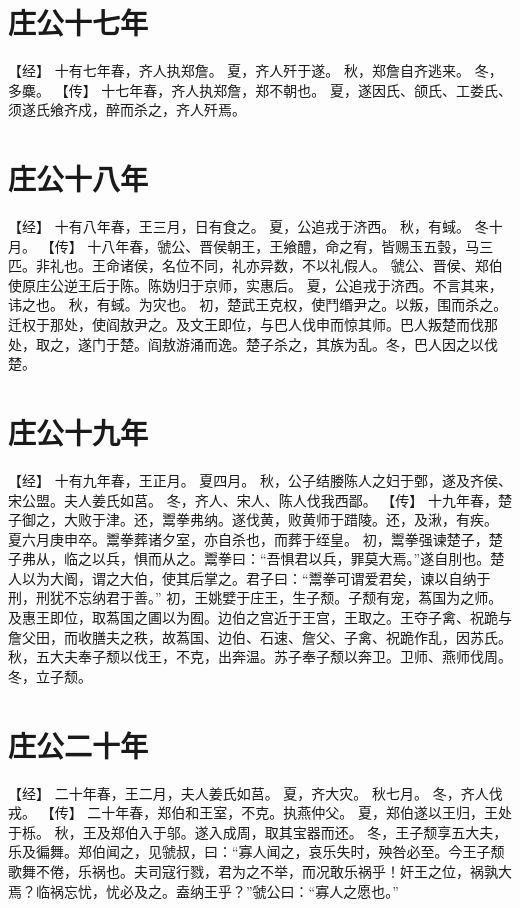 \documentclass[a4paper,12pt,UTF8,twoside]{ctexbook}
\begin{document}
\chapter{庄公十七年}

【经】
十有七年春，齐人执郑詹。
夏，齐人歼于遂。
秋，郑詹自齐逃来。
冬，多麋。
【传】
十七年春，齐人执郑詹，郑不朝也。
夏，遂因氏、颌氏、工娄氏、须遂氏飨齐戍，醉而杀之，齐人歼焉。

\chapter{庄公十八年}

【经】
十有八年春，王三月，日有食之。
夏，公追戎于济西。
秋，有蜮。
冬十月。
【传】
十八年春，虢公、晋侯朝王，王飨醴，命之宥，皆赐玉五瑴，马三匹。非礼也。王命诸侯，名位不同，礼亦异数，不以礼假人。
虢公、晋侯、郑伯使原庄公逆王后于陈。陈妫归于京师，实惠后。
夏，公追戎于济西。不言其来，讳之也。
秋，有蜮。为灾也。
初，楚武王克权，使鬥缗尹之。以叛，围而杀之。迁权于那处，使阎敖尹之。及文王即位，与巴人伐申而惊其师。巴人叛楚而伐那处，取之，遂门于楚。阎敖游涌而逸。楚子杀之，其族为乱。冬，巴人因之以伐楚。

\chapter{庄公十九年}

【经】
十有九年春，王正月。
夏四月。
秋，公子结媵陈人之妇于鄄，遂及齐侯、宋公盟。夫人姜氏如莒。
冬，齐人、宋人、陈人伐我西鄙。
【传】
十九年春，楚子御之，大败于津。还，鬻拳弗纳。遂伐黄，败黄师于踖陵。还，及湫，有疾。
夏六月庚申卒。鬻拳葬诸夕室，亦自杀也，而葬于绖皇。
初，鬻拳强谏楚子，楚子弗从，临之以兵，惧而从之。鬻拳曰：“吾惧君以兵，罪莫大焉。”遂自刖也。楚人以为大阍，谓之大伯，使其后掌之。君子曰：“鬻拳可谓爱君矣，谏以自纳于刑，刑犹不忘纳君于善。”
初，王姚嬖于庄王，生子颓。子颓有宠，蒍国为之师。及惠王即位，取蒍国之圃以为囿。边伯之宫近于王宫，王取之。王夺子禽、祝跪与詹父田，而收膳夫之秩，故蒍国、边伯、石速、詹父、子禽、祝跪作乱，因苏氏。
秋，五大夫奉子颓以伐王，不克，出奔温。苏子奉子颓以奔卫。卫师、燕师伐周。
冬，立子颓。

\chapter{庄公二十年}

【经】
二十年春，王二月，夫人姜氏如莒。
夏，齐大灾。
秋七月。
冬，齐人伐戎。
【传】
二十年春，郑伯和王室，不克。执燕仲父。
夏，郑伯遂以王归，王处于栎。
秋，王及郑伯入于邬。遂入成周，取其宝器而还。
冬，王子颓享五大夫，乐及徧舞。郑伯闻之，见虢叔，曰：“寡人闻之，哀乐失时，殃咎必至。今王子颓歌舞不倦，乐祸也。夫司寇行戮，君为之不举，而况敢乐祸乎！奸王之位，祸孰大焉？临祸忘忧，忧必及之。盍纳王乎？”虢公曰：“寡人之愿也。”
\end{document}
